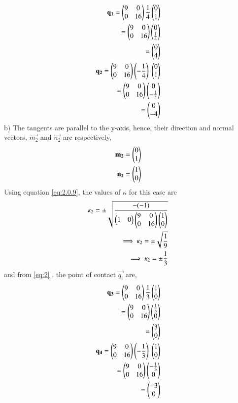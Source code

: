 \documentclass[journal,12pt,twocolumn]{IEEEtran}
\begin{document}
\begin{align}
    \vec{q_1}=\myvec{9 & 0 \\ 0 & 16}\frac{1}{4}\myvec{0\\1}\\
    =\myvec{9 & 0 \\ 0 & 16}\myvec{0\\\frac{1}{4}}\\
    =\myvec{0\\4}\\
    \vec{q_2}=\myvec{9 & 0 \\ 0 & 16}\left(-\frac{1}{4}\right)\ \myvec{0\\1}\\
    =\myvec{9 & 0 \\ 0 & 16}\myvec{0\\-\frac{1}{4}}\\
    =\myvec{0\\-4}
\end{align}
b) The tangents are parallel to the y-axis, hence, their direction and normal vectors, $\vec{m_2}$ and $\vec{n_2}$ are respectively,
\begin{align}
\mathbf{m_2}=\begin{pmatrix}0\\1\end{pmatrix}\\
\mathbf{n_2}=\begin{pmatrix}1\\0\end{pmatrix}
\end{align}
Using equation \eqref{eq:2.0.9}, the values of $\kappa$ for this case are
\begin{align}
     \kappa_2=\pm \sqrt{\frac{-(-1)}{\begin{pmatrix}1 & 0\end{pmatrix}\begin{pmatrix}9 & 0 \\ 0 & 16\end{pmatrix} \begin{pmatrix}1\\0\end{pmatrix}}}\\
 \implies \kappa_2=\pm \sqrt{\frac{1}{9}}\\
    \implies \kappa_2=\pm \frac{1}{3} 
\end{align}
and from \eqref{eq:2} , the point of contact $\vec{q_i}$ are,
\begin{align}
\vec{q_3}=\myvec{9 & 0 \\ 0 & 16}\frac{1}{3}\myvec{1\\0}\\
    =\myvec{9 & 0 \\ 0 & 16}\myvec{\frac{1}{3}\\0}\\
    =\myvec{3\\0}\\
\vec{q_4}=\myvec{9 & 0 \\ 0 & 16}\left(-\frac{1}{3}\right)\ \myvec{1\\0}\\
    =\myvec{9 & 0 \\ 0 & 16}\myvec{-\frac{1}{3}\\0}\\
    =\myvec{-3\\0}
\end{align}
\end{document}
